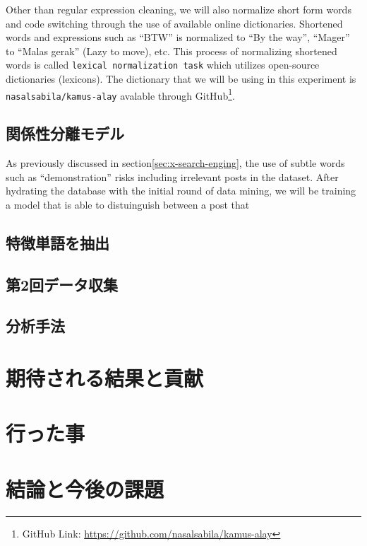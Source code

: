 \documentclass{jabstract}
\begin{document}
\begin{multicols}{2}
Other than regular expression cleaning, we will also normalize short form words and code switching through the use of available online dictionaries. Shortened words and expressions such as ``BTW'' is normalized to ``By the way'', ``Mager'' to ``Malas gerak'' (Lazy to move), etc. This process of normalizing shortened words is called \texttt{lexical normalization task} which utilizes open-source dictionaries (lexicons)\cite{han-baldwin-2011-lexical}. The dictionary that we will be using in this experiment is \texttt{nasalsabila/kamus-alay} avalable through GitHub\footnote{GitHub Link: \url{https://github.com/nasalsabila/kamus-alay}}\cite{8629151}.

\subsection{関係性分離モデル}
As previously discussed in section\ref{sec:x-search-enging}, the use of subtle words such as ``demonstration'' risks including irrelevant posts in the dataset. After hydrating the database with the initial round of data mining, we will be training a model that is able to distuinguish between a post that 

\subsection{特徴単語を抽出}
\subsection{第2回データ収集}
\subsection{分析手法}
\section{期待される結果と貢献}
\section{行った事}
\section{結論と今後の課題}

{\small


}



\end{multicols}
\end{document}
